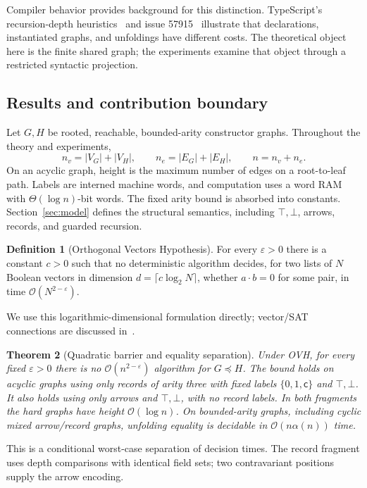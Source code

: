 \documentclass[11pt,letterpaper]{article}
\newtheorem{theorem}{Theorem}
\theoremstyle{definition}\newtheorem{definition}[theorem]{Definition}
\newcommand{\Sub}{\ensuremath{\preceq}}
\newcommand{\Oh}{\mathcal O}
\newcommand{\checkfield}{\mathsf c}
\begin{document}
Compiler behavior provides background for this distinction. TypeScript's recursion-depth heuristics~\cite{TS46} and issue 57915~\cite{TS57915} illustrate that declarations, instantiated graphs, and unfoldings have different costs. The theoretical object here is the finite shared graph; the experiments examine that object through a restricted syntactic projection.

\subsection{Results and contribution boundary}
Let $G,H$ be rooted, reachable, bounded-arity constructor graphs. Throughout the theory and experiments,
\[
 n_v=|V_G|+|V_H|,\qquad n_e=|E_G|+|E_H|,\qquad n=n_v+n_e.
\]
On an acyclic graph, height is the maximum number of edges on a root-to-leaf path. Labels are interned machine words, and computation uses a word RAM with $\Theta(\log n)$-bit words. The fixed arity bound is absorbed into constants. Section~\ref{sec:model} defines the structural semantics, including $\top,\bot$, arrows, records, and guarded recursion.

\begin{definition}[Orthogonal Vectors Hypothesis]\label{def:ovh}
For every $\varepsilon>0$ there is a constant $c>0$ such that no deterministic algorithm decides, for two lists of $N$ Boolean vectors in dimension $d=\lceil c\log_2N\rceil$, whether $a\cdot b=0$ for some pair, in time $\Oh(N^{2-\varepsilon})$.
\end{definition}
We use this logarithmic-dimensional formulation directly; vector/SAT connections are discussed in~\cite{Williams05}.

\begin{theorem}[Quadratic barrier and equality separation]\label{thm:A}
Under OVH, for every fixed $\varepsilon>0$ there is no $\Oh(n^{2-\varepsilon})$ algorithm for $G\Sub H$. The bound holds on acyclic graphs using only records of arity three with fixed labels $\{0,1,\checkfield\}$ and $\top,\bot$. It also holds using only arrows and $\top,\bot$, with no record labels. In both fragments the hard graphs have height $\Oh(\log n)$. On bounded-arity graphs, including cyclic mixed arrow/record graphs, unfolding equality is decidable in $\Oh(n\alpha(n))$ time.
\end{theorem}
This is a conditional worst-case separation of decision times. The record fragment uses depth comparisons with identical field sets; two contravariant positions supply the arrow encoding.
\end{document}
